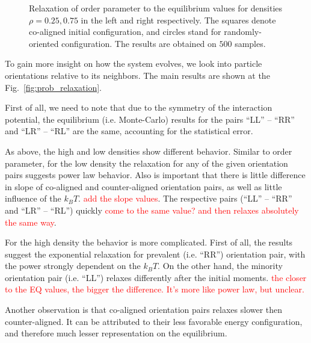 \begin{figure}[h]
\begin{subfigure}[t]{0.49\textwidth}
\end{subfigure}
	\captionsetup{justification=centering, width=0.9\columnwidth}
	\caption{Relaxation of order parameter to the equilibrium values for densities $\rho = 0.25, 0.75$ in the left and right respectively. The squares denote co-aligned initial configuration, and circles stand for randomly-oriented configuration. The results are obtained on $500$ samples.}
	\label{fig:op_relaxation}
\end{figure}

To gain more insight on how the system evolves, we look into particle orientations relative to its neighbors. The main results are shown at the Fig.~\ref{fig:prob_relaxation}.

First of all, we need to note that due to the symmetry of the interaction potential, the equilibrium (i.e. Monte-Carlo) results for the pairs ``LL'' -- ``RR'' and ``LR'' -- ``RL'' are the same, accounting for the statistical error.

As above, the high and low densities show different behavior. Similar to order parameter, for the low density the relaxation for any of the given orientation pairs suggests power law behavior. Also is important that there is little difference in slope of co-aligned and counter-aligned orientation pairs, as well as little influence of the $k_BT$. \textcolor{red}{add the slope values}. The respective pairs (``LL'' -- ``RR'' and ``LR'' -- ``RL'') quickly \textcolor{red}{come to the same value? and then relaxes absolutely the same way}.

For the high density the behavior is more complicated. First of all, the results suggest the exponential relaxation for prevalent (i.e. ``RR'') orientation pair, with the power strongly dependent on the $k_BT$. On the other hand, the minority orientation pair (i.e. ``LL'') relaxes differently after the initial moments. \textcolor{red}{the closer to the EQ values, the bigger the difference. It's more like power law, but unclear.}

Another observation is that co-aligned orientation pairs relaxes slower then counter-aligned. It can be attributed to their less favorable energy configuration, and therefore much lesser representation on the equilibrium.

